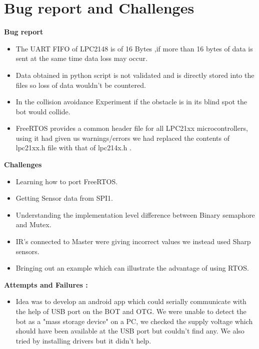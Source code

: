 \documentclass[a4paper,12pt,oneside]{book}
\begin{document}
\section{Bug report and Challenges}
\large{\textbf{Bug report}}
\begin{itemize}
  \item The UART FIFO of LPC2148 is of 16 Bytes ,if more than 16 bytes of data is sent at the same time data loss may occur.
  \\
  \item Data obtained in python script is not validated and is directly stored into the files so loss of data wouldn't be countered.
  \\
  \item In the collision avoidance Experiment if the obstacle is in its blind spot the bot would collide.
  \\
  \item FreeRTOS provides a common header file for all LPC21xx microcontrollers, using it had given us warnings/errors we had replaced the contents of lpc21xx.h file with that of lpc214x.h .
    \end{itemize}
\newline
  \large{\textbf{Challenges}}
  \begin{itemize}
  
  \item Learning how to port FreeRTOS.
  \item Getting Sensor data from SPI1.
  \item Understanding the implementation level difference between Binary semaphore and Mutex.
  \item IR's connected to Master were giving incorrect values we instead used Sharp sensors.
  \item Bringing out an example which can illustrate the advantage of using RTOS.
  \end{itemize}
 \newline 
 \large{\textbf{Attempts and Failures :}}
 \begin{itemize}
  
 \item Idea was to develop an android app which could serially communicate with the help of USB port on the BOT and OTG. We were unable to detect the bot as a "mass storage device" on a PC, we checked the supply voltage which should have been available at the USB port but couldn't find any. We also tried by installing drivers but it didn't help.\\
\end{itemize}
\end{document}

